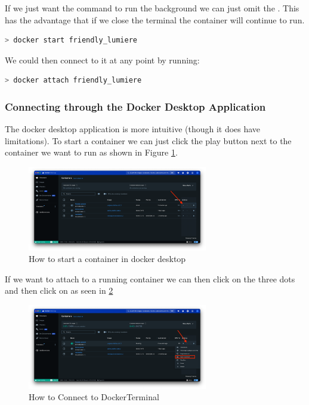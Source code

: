 \documentclass[final]{article}
\numberwithin{equation}{section}
\theoremstyle{remarkStyle}
\begin{document}
If we just want the command to run the background we can just omit the . This has the advantage that if we close the terminal the container will continue to run.

\begin{lstlisting}[language=bash]
  > docker start friendly_lumiere
\end{lstlisting}

We could then connect to it at any point by running:
\begin{lstlisting}[language=bash]
  > docker attach friendly_lumiere
\end{lstlisting}

\subsubsection{Connecting through the Docker Desktop Application}
The docker desktop application is more intuitive (though it does have limitations).
To start a container we can just click the play button next to the container we want to run as shown in Figure \ref{fig:docker_how_to_run}.
\begin{figure}[H]
  \centering
  \includegraphics[width=0.7\textwidth]{DockerRUNHOW.png}
  \caption{How to start a container in docker desktop}%
  \label{fig:docker_how_to_run}%
\end{figure}


If we want to attach to a running container we can then click on the three dots and then click on  as seen in \ref{fig:docker_how_to_connect}

\begin{figure}[H]
  \centering
  \includegraphics[width=0.7\textwidth]{DockerDesktop_CLI.png}
  \caption{How to Connect to DockerTerminal}%
  \label{fig:docker_how_to_connect}%
\end{figure}
\end{document}
